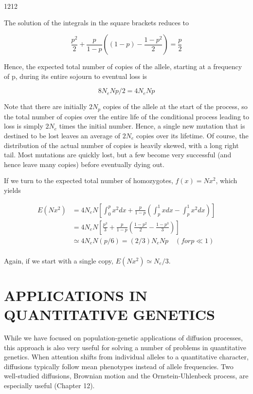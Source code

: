 \documentclass{article}
\begin{document}
1212

The solution of the integrals in the square brackets reduces to

\begin{equation}
\frac{p^{2}}{2}+\frac{p}{1-p}\left((1-p)-\frac{1-p^{2}}{2}\right)=\frac{p}{2}
\end{equation}

Hence, the expected total number of copies of the allele, starting at a frequency of p, during its entire sojourn to eventual loss is

\begin{equation}
8N_{e}Np/2=4N_{e}Np
\end{equation}

Note that there are initially  $ 2N_p $ copies of the allele at the start of the process, so the total number of copies over the entire life of the conditional process leading to loss is simply  $ 2N_e $ times the initial number. Hence, a single new mutation that is destined to be lost leaves an average of  $ 2N_e $ copies over its lifetime. Of course, the distribution of the actual number of copies is heavily skewed, with a long right tail. Most mutations are quickly lost, but a few become very successful (and hence leave many copies) before eventually dying out.

If we turn to the expected total number of homozygotes,  $ f(x) = Nx^{2} $, which yields

\begin{equation}
\begin{aligned}E(Nx^{2})&=4N_{e}N\left[\int_{0}^{p}x^{2}dx+\frac{p}{1-p}\left(\int_{p}^{1}x dx-\int_{p}^{1}x^{2}dx\right)\right]\\&=4N_{e}N\left[\frac{p^{3}}{3}+\frac{p}{1-p}\left(\frac{1-p^{2}}{2}-\frac{1-p^{3}}{3}\right)\right]\\&\simeq4N_{e}N(p/6)=(2/3)N_{e}Np\quad(for p\ll1)\\ \end{aligned}
\end{equation}

Again, if we start with a single copy,  $ E(Nx^2) \simeq N_e/3 $.

\section{APPLICATIONS IN QUANTITATIVE GENETICS}
While we have focused on population-genetic applications of diffusion processes, this approach is also very useful for solving a number of problems in quantitative genetics. When attention shifts from individual alleles to a quantitative character, diffusions typically follow mean phenotypes instead of allele frequencies. Two well-studied diffusions, Brownian motion and the Ornstein-Uhlenbeck process, are especially useful (Chapter 12).
\end{document}
